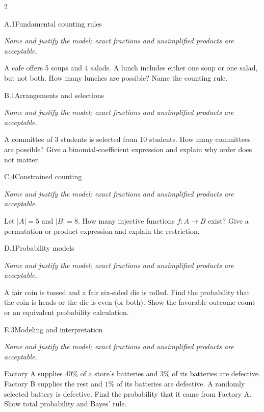 \documentclass[9pt]{extarticle}
\begin{document}
\CoreWorkArea
\FormBreak
{}
\begin{multicols}{2}
\begin{CoreProblem}{A.1}{Fundamental counting rules}
{\scriptsize\textit{Name and justify the model; exact fractions and unsimplified products are acceptable.}\par}
A cafe offers 5 soups and 4 salads. A lunch includes either one soup
    or one salad, but not both. How many lunches are possible? Name the counting
    rule.
\end{CoreProblem}
\begin{CoreProblem}{B.1}{Arrangements and selections}
{\scriptsize\textit{Name and justify the model; exact fractions and unsimplified products are acceptable.}\par}
A committee of 3 students is selected from 10 students. How many
    committees are possible? Give a binomial-coefficient expression and explain
    why order does not matter.
\end{CoreProblem}
\begin{CoreProblem}{C.4}{Constrained counting}
{\scriptsize\textit{Name and justify the model; exact fractions and unsimplified products are acceptable.}\par}
Let $|A|=5$ and $|B|=8$. How many injective functions $f:A\to B$
    exist? Give a permutation or product expression and explain the restriction.
\end{CoreProblem}
\columnbreak
\begin{CoreProblem}{D.1}{Probability models}
{\scriptsize\textit{Name and justify the model; exact fractions and unsimplified products are acceptable.}\par}
A fair coin is tossed and a fair six-sided die is rolled. Find the
    probability that the coin is heads or the die is even (or both). Show the
    favorable-outcome count or an equivalent probability calculation.
\end{CoreProblem}
\begin{CoreProblem}{E.3}{Modeling and interpretation}
{\scriptsize\textit{Name and justify the model; exact fractions and unsimplified products are acceptable.}\par}
Factory A supplies $40\%$ of a store's batteries and $3\%$ of its
    batteries are defective. Factory B supplies the rest and $1\%$ of its
    batteries are defective. A randomly selected battery is defective. Find the
    probability that it came from Factory A. Show total probability and Bayes'
    rule.
\end{CoreProblem}
\end{multicols}
\CoreWorkArea
\end{document}
